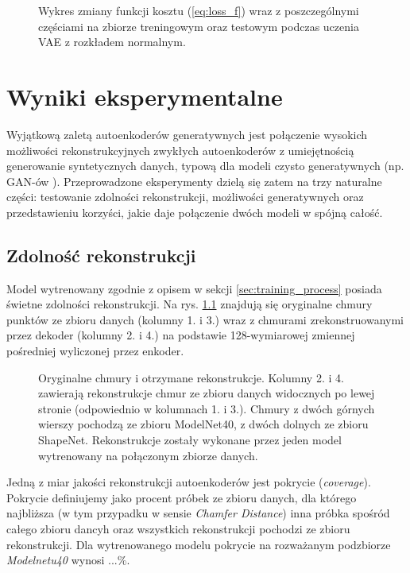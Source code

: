 \documentclass{iithesis}
\begin{document}
\begin{figure}
    \caption{\label{fig:loss_decrease} Wykres zmiany funkcji kosztu (\ref{eq:loss_f}) wraz z poszczególnymi częściami
    na zbiorze treningowym oraz testowym podczas uczenia VAE z rozkładem normalnym.}
\end{figure}

\chapter{Wyniki eksperymentalne}
Wyjątkową zaletą autoenkoderów generatywnych jest połączenie wysokich możliwości rekonstrukcyjnych
zwykłych autoenkoderów z umiejętnością generowanie syntetycznych danych, typową dla modeli
czysto generatywnych (np. GAN-ów \cite{gan}). Przeprowadzone eksperymenty dzielą się zatem
na trzy naturalne części: testowanie zdolności rekonstrukcji, możliwości generatywnych
oraz przedstawieniu korzyści, jakie daje połączenie dwóch modeli w spójną całość.

\section{Zdolność rekonstrukcji}
Model wytrenowany zgodnie z opisem w sekcji \ref{sec:training_process} posiada świetne zdolności
rekonstrukcji. Na rys. \ref{fig:simple_reconstructions} znajdują się oryginalne chmury punktów
ze zbioru danych (kolumny 1. i 3.) wraz z chmurami zrekonstruowanymi przez dekoder
(kolumny 2. i 4.) na podstawie 128-wymiarowej zmiennej pośredniej wyliczonej przez enkoder.

\begin{figure}
    \caption{\label{fig:simple_reconstructions} Oryginalne chmury i otrzymane rekonstrukcje.
    Kolumny 2. i 4. zawierają rekonstrukcje chmur ze zbioru danych widocznych po lewej stronie
    (odpowiednio w kolumnach 1. i 3.). Chmury z dwóch górnych wierszy pochodzą ze zbioru
    ModelNet40, z dwóch dolnych ze zbioru ShapeNet. Rekonstrukcje zostały wykonane przez jeden
    model wytrenowany na połączonym zbiorze danych.}
\end{figure}

Jedną z miar jakości rekonstrukcji autoenkoderów jest pokrycie (\textit{coverage}). Pokrycie definiujemy jako procent
próbek ze zbioru danych, dla którego najbliższa (w tym przypadku w sensie \textit{Chamfer Distance}) inna próbka
spośród całego zbioru dancyh oraz wszystkich rekonstrukcji pochodzi ze zbioru rekonstrukcji.
Dla wytrenowanego modelu pokrycie na rozważanym podzbiorze \textit{Modelnetu40} wynosi $...\%$.
\end{document}
